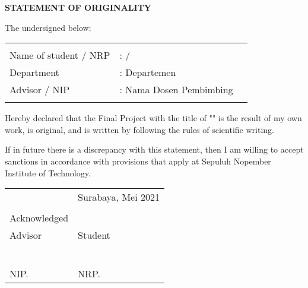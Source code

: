 \begin{center}
  \large
  \textbf{STATEMENT OF ORIGINALITY}
\end{center}

\thispagestyle{empty}

\vspace{2ex}


\noindent The undersigned below:

\noindent\begin{tabularx}{\textwidth}{X X l}
                        &                         \\
  Name of student / NRP & : \name{} / \nrp{}      \\
  Department            & : Departemen            \\
  Advisor / NIP         & : Nama Dosen Pembimbing \\
                        &                         \\
\end{tabularx}

Hereby declared that the Final Project with the title of "" is the result of my own work, is original, and is written by following the rules of scientific writing.

If in future there is a discrepancy with this statement, then I am willing to accept sanctions in accordance with provisions that apply at Sepuluh Nopember Institute of Technology.

\vspace{8ex}

\noindent\begin{tabularx}{\textwidth}{X l}
                     & Surabaya, Mei 2021 \\
                     &                    \\
  Acknowledged       &                    \\
  Advisor            & Student            \\
                     &                    \\
                     &                    \\
                     &                    \\
                     &                    \\
                     &                    \\
  \advisor{}         & \name{}            \\
  NIP. \advisornip{} & NRP. \nrp{}        \\
\end{tabularx}